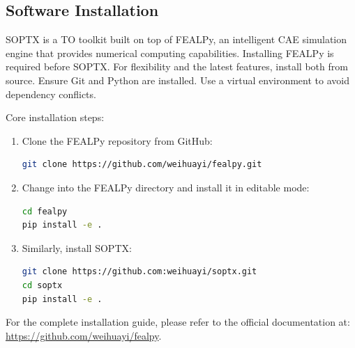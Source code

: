 \documentclass[mathpazo]{cicp}
\begin{document}
\subsection{Software Installation}
SOPTX is a TO toolkit built on top of FEALPy, an intelligent CAE simulation engine that provides numerical computing capabilities. Installing FEALPy is required before SOPTX. For flexibility and the latest features, install both from source. Ensure Git and Python are installed. Use a virtual environment to avoid dependency conflicts.

Core installation steps:
\vspace{-0.5ex} %
\begin{enumerate} 
	\item Clone the FEALPy repository from GitHub:
\vspace{-0.5ex} %
\begin{lstlisting}[language=bash]
git clone https://github.com/weihuayi/fealpy.git
\end{lstlisting}
\vspace{-0.5ex} %
	\item Change into the FEALPy directory and install it in editable mode:
\vspace{-0.5ex} %
\begin{lstlisting}[language=bash]
cd fealpy
pip install -e . 
\end{lstlisting}
\vspace{-0.5ex} %
	\item Similarly, install SOPTX:
\vspace{-0.5ex} %
\begin{lstlisting}[language=bash]
git clone https://github.com:weihuayi/soptx.git
cd soptx
pip install -e . 
\end{lstlisting}
\vspace{-0.5ex} %
\end{enumerate}
\vspace{-0.5ex} %

For the complete installation guide, please refer to the official documentation at: \url{https://github.com/weihuayi/fealpy}.
\end{document}

